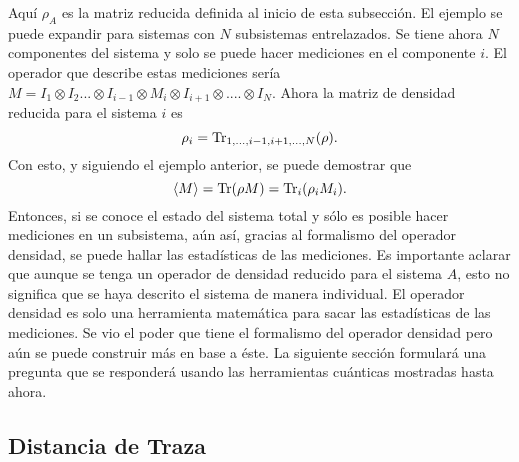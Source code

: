 Aquí $\rho_{A}$ es la matriz reducida definida al inicio de esta subsección. El ejemplo se puede expandir para sistemas con $N$ subsistemas entrelazados. Se tiene ahora $N$ componentes del sistema y solo se puede hacer mediciones en el componente $i$. El operador que describe estas mediciones sería $M= I_{1}\otimes I_{2} ... \otimes I_{i-1} \otimes M_{i} \otimes I_{i+1}\otimes .... \otimes I_{N}$. Ahora la matriz de densidad reducida para el sistema $i$ es
\begin{equation}
\rho_{i}= \Tr_{1,...,i-1,i+1,...,N}(\rho).
\end{equation}
Con esto, y siguiendo el ejemplo anterior, se puede demostrar que  \cite{Decoherence}
\begin{equation}
\langle M \rangle = \Tr(\rho M)=\Tr_{i}(\rho_{i} M_{i}).
\end{equation}
Entonces, si se conoce el estado del sistema total y sólo es posible hacer mediciones en un subsistema, aún así, gracias al formalismo del operador densidad, se puede hallar las estadísticas de las mediciones. Es importante aclarar que aunque se tenga un operador de densidad reducido para el sistema $A$, esto no significa que se haya descrito el sistema de manera individual. El operador densidad es solo una herramienta matemática para sacar las estadísticas de las mediciones. Se vio el poder que tiene el formalismo del operador densidad pero aún se puede construir más en base a éste. La siguiente sección formulará una pregunta que se responderá usando las herramientas cuánticas mostradas hasta ahora.
\subsection{Distancia de Traza}


